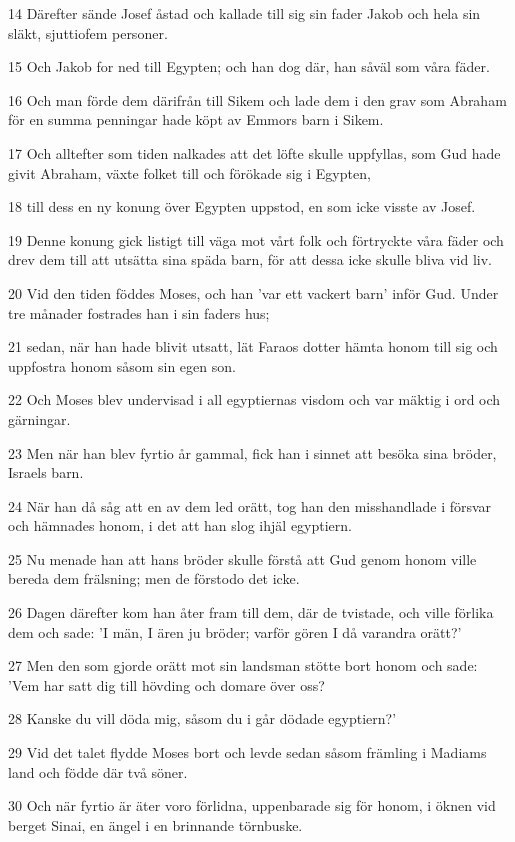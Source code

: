 \par 14 Därefter sände Josef åstad och kallade till sig sin fader Jakob och hela sin släkt, sjuttiofem personer.
\par 15 Och Jakob for ned till Egypten; och han dog där, han såväl som våra fäder.
\par 16 Och man förde dem därifrån till Sikem och lade dem i den grav som Abraham för en summa penningar hade köpt av Emmors barn i Sikem.
\par 17 Och alltefter som tiden nalkades att det löfte skulle uppfyllas, som Gud hade givit Abraham, växte folket till och förökade sig i Egypten,
\par 18 till dess en ny konung över Egypten uppstod, en som icke visste av Josef.
\par 19 Denne konung gick listigt till väga mot vårt folk och förtryckte våra fäder och drev dem till att utsätta sina späda barn, för att dessa icke skulle bliva vid liv.
\par 20 Vid den tiden föddes Moses, och han 'var ett vackert barn' inför Gud. Under tre månader fostrades han i sin faders hus;
\par 21 sedan, när han hade blivit utsatt, lät Faraos dotter hämta honom till sig och uppfostra honom såsom sin egen son.
\par 22 Och Moses blev undervisad i all egyptiernas visdom och var mäktig i ord och gärningar.
\par 23 Men när han blev fyrtio år gammal, fick han i sinnet att besöka sina bröder, Israels barn.
\par 24 När han då såg att en av dem led orätt, tog han den misshandlade i försvar och hämnades honom, i det att han slog ihjäl egyptiern.
\par 25 Nu menade han att hans bröder skulle förstå att Gud genom honom ville bereda dem frälsning; men de förstodo det icke.
\par 26 Dagen därefter kom han åter fram till dem, där de tvistade, och ville förlika dem och sade: 'I män, I ären ju bröder; varför gören I då varandra orätt?'
\par 27 Men den som gjorde orätt mot sin landsman stötte bort honom och sade: 'Vem har satt dig till hövding och domare över oss?
\par 28 Kanske du vill döda mig, såsom du i går dödade egyptiern?'
\par 29 Vid det talet flydde Moses bort och levde sedan såsom främling i Madiams land och födde där två söner.
\par 30 Och när fyrtio är äter voro förlidna, uppenbarade sig för honom, i öknen vid berget Sinai, en ängel i en brinnande törnbuske.
